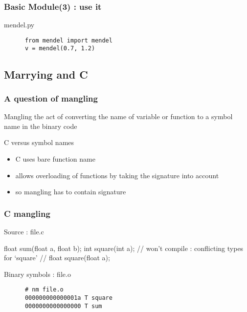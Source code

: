 \begin{frame}[fragile]
  \frametitle{Basic Module(3) : use it}
  \begin{block}{mendel.py}
    \begin{verbatim}
      from mendel import mendel
      v = mendel(0.7, 1.2)
    \end{verbatim}
  \end{block}
\end{frame}


\subsection[C]{Marrying \cpp and C}

\begin{frame}[fragile]
  \frametitle{A question of mangling}
  \begin{block}{Mangling}
    the act of converting the name of variable or function to a symbol name in the binary code
  \end{block}
  \begin{block}{C versus \cpp symbol names}
    \begin{itemize}
    \item C uses bare function name
    \item \cpp allows overloading of functions by taking the signature into account
    \item so \cpp mangling has to contain signature
    \end{itemize}
  \end{block}
\end{frame}

\begin{frame}[fragile]
  \frametitle{C mangling}
  \begin{exampleblock}{Source : file.c}
    \begin{cppcode*}{}
      float sum(float a, float b);
      int square(int a);
      // won't compile : conflicting types for ‘square’
      // float square(float a);
    \end{cppcode*}
  \end{exampleblock}
  \begin{block}{Binary symbols : file.o}
    \begin{verbatim}
      # nm file.o
      000000000000001a T square
      0000000000000000 T sum
    \end{verbatim}
  \end{block}  
\end{frame}

